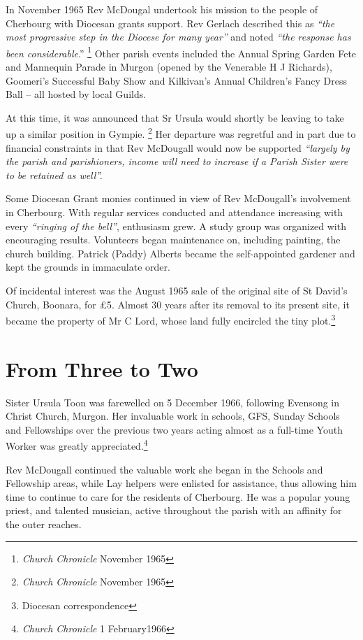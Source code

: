 In November 1965 Rev McDougal undertook his mission to the people of Cherbourg with Diocesan grants support. Rev Gerlach described this as \emph{``the most progressive step in the Diocese for many year''} and noted \emph{``the response has been considerable}.'' \footnote{\emph{Church Chronicle} November 1965} Other parish events included the Annual Spring Garden Fete and Mannequin Parade in Murgon (opened by the Venerable H J Richards), Goomeri's Successful Baby Show and Kilkivan's Annual Children's Fancy Dress Ball -- all hosted by local Guilds.

At this time, it was announced that Sr Ursula would shortly be leaving to take up a similar position in Gympie. \footnote{\emph{Church Chronicle} November 1965} Her departure was regretful and in part due to financial constraints in that Rev McDougall would now be supported \emph{``largely by the parish and parishioners, income will need to increase if a Parish Sister were to be retained as well''.}

Some Diocesan Grant monies continued in view of Rev McDougall's involvement in Cherbourg. With regular services conducted and attendance increasing with every \emph{``ringing of the bell''}, enthusiasm grew. A study group was organized with encouraging results. Volunteers began maintenance on, including painting, the church building. Patrick (Paddy) Alberts became the self-appointed gardener and kept the grounds in immaculate order.

Of incidental interest was the August 1965 sale of the original site of St David's Church, Boonara, for £5. Almost 30 years after its removal to its present site, it became the property of Mr C Lord, whose land fully encircled the tiny plot.\footnote{Diocesan correspondence}

\hypertarget{from-three-to-two}{%
\section{From Three to Two}\label{from-three-to-two}}

Sister Ursula Toon was farewelled on 5 December 1966, following Evensong in Christ Church, Murgon. Her invaluable work in schools, GFS, Sunday Schools and Fellowships over the previous two years acting almost as a full-time Youth Worker was greatly appreciated.\footnote{\emph{Church Chronicle} 1 February1966}

Rev McDougall continued the valuable work she began in the Schools and Fellowship areas, while Lay helpers were enlisted for assistance, thus allowing him time to continue to care for the residents of Cherbourg. He was a popular young priest, and talented musician, active throughout the parish with an affinity for the outer reaches.

